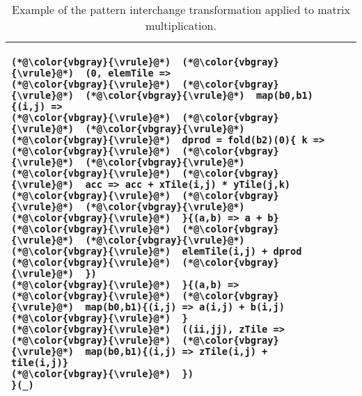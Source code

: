 \begin{table*}[t]
\begin{tabular}{@{}lll@{}}
{\begin{lstlisting}[numbers=none]
(*@\color{vbgray}{\vrule}@*)  (*@\color{vbgray}{\vrule}@*)  (0, elemTile =>
(*@\color{vbgray}{\vrule}@*)  (*@\color{vbgray}{\vrule}@*)  (*@\color{vbgray}{\vrule}@*)  map(b0,b1){(i,j) =>
(*@\color{vbgray}{\vrule}@*)  (*@\color{vbgray}{\vrule}@*)  (*@\color{vbgray}{\vrule}@*)  (*@\color{vbgray}{\vrule}@*)  dprod = fold(b2)(0){ k =>
(*@\color{vbgray}{\vrule}@*)  (*@\color{vbgray}{\vrule}@*)  (*@\color{vbgray}{\vrule}@*)  (*@\color{vbgray}{\vrule}@*)  (*@\color{vbgray}{\vrule}@*)  acc => acc + xTile(i,j) * yTile(j,k)
(*@\color{vbgray}{\vrule}@*)  (*@\color{vbgray}{\vrule}@*)  (*@\color{vbgray}{\vrule}@*)  (*@\color{vbgray}{\vrule}@*)  }{(a,b) => a + b}
(*@\color{vbgray}{\vrule}@*)  (*@\color{vbgray}{\vrule}@*)  (*@\color{vbgray}{\vrule}@*)  (*@\color{vbgray}{\vrule}@*)  elemTile(i,j) + dprod
(*@\color{vbgray}{\vrule}@*)  (*@\color{vbgray}{\vrule}@*)  })
(*@\color{vbgray}{\vrule}@*)  }{(a,b) =>
(*@\color{vbgray}{\vrule}@*)  (*@\color{vbgray}{\vrule}@*)  map(b0,b1){(i,j) => a(i,j) + b(i,j)
(*@\color{vbgray}{\vrule}@*)  }
(*@\color{vbgray}{\vrule}@*)  ((ii,jj), zTile =>
(*@\color{vbgray}{\vrule}@*)  (*@\color{vbgray}{\vrule}@*)  map(b0,b1){(i,j) => zTile(i,j) + tile(i,j)}
(*@\color{vbgray}{\vrule}@*)  })
}(_)
\end{lstlisting}} \\ \bottomrule
\end{tabular}
\caption{Example of the pattern interchange transformation applied to matrix multiplication.}
\label{table:interchange-examples}
\end{table*}
